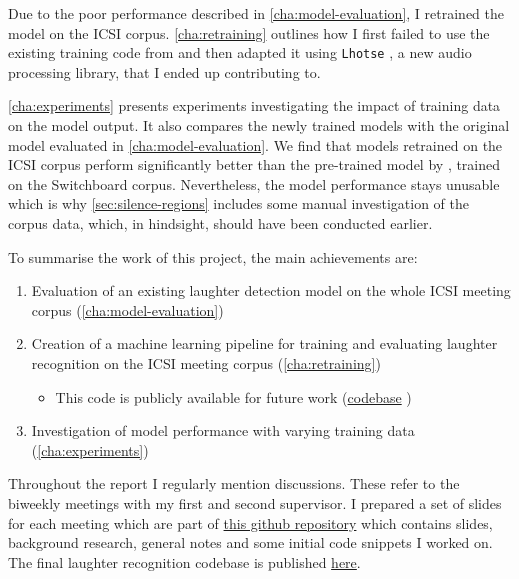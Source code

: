 \documentclass[bsc,frontabs,parskip,deptreport]{infthesis}
\newcommand{\coderepo}{\href{https://github.com/LasseWolter/laughter-detection-icsi}{codebase} }
\begin{document}
Due to the poor performance described in \autoref{cha:model-evaluation}, I retrained the model on the ICSI corpus. \autoref{cha:retraining} outlines how I first failed to use the existing training code from \citet{gillick2021robust} and then adapted it using \texttt{Lhotse} \citep{zelasko2021lhotse}, a new audio processing library, that I ended up contributing to.

\autoref{cha:experiments} presents experiments investigating the impact of training data on the model output. It also compares the newly trained models with the original model evaluated in \autoref{cha:model-evaluation}. We find that models retrained on the ICSI corpus perform significantly better than the pre-trained model by \citet{gillick2021robust}, trained on the Switchboard corpus. Nevertheless, the model performance stays unusable which is why \autoref{sec:silence-regions} includes some manual investigation of the corpus data, which, in hindsight, should have been conducted earlier. 


To summarise the work of this project, the main achievements are:
\begin{enumerate}
  \item Evaluation of an existing laughter detection model on the whole ICSI meeting corpus (\autoref{cha:model-evaluation})
  \item Creation of a machine learning pipeline for training and evaluating laughter recognition on the ICSI meeting corpus (\autoref{cha:retraining})
  \begin{itemize}
      \item This code is publicly available for future work (\coderepo)
  \end{itemize}
  \item Investigation of model performance with varying training data (\autoref{cha:experiments})
\end{enumerate}

Throughout the report I regularly mention discussions. These refer to the biweekly meetings with my first and second supervisor. I prepared a set of slides for each meeting which are part of \href{https://github.com/LasseWolter/honours-project-21-22/tree/main/Meeting_Notes}{this github repository} which contains slides, background research, general notes and some initial code snippets I worked on. 
The final laughter recognition codebase is published \href{https://github.com/LasseWolter/laughter-detection-icsi}{here}.
\end{document}
